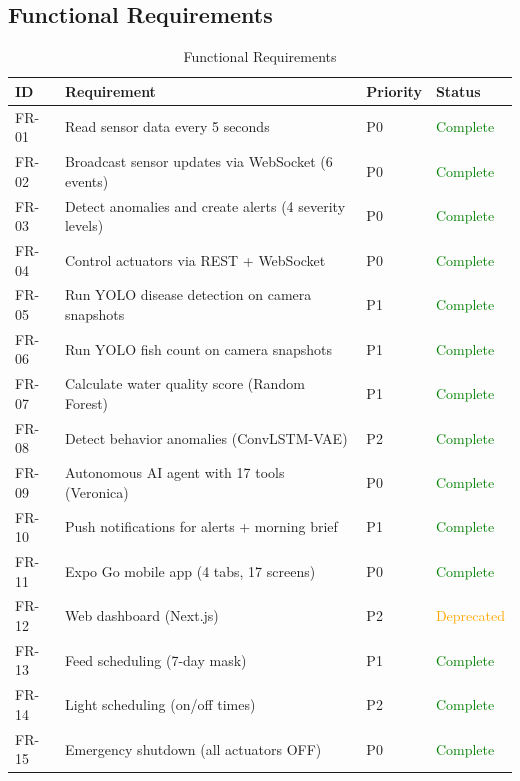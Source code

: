 \documentclass[12pt,a4paper,oneside]{article}
\begin{document}
\subsection{Functional Requirements}
\begin{table}[H]
    \centering
    \begin{tabularx}{\textwidth}{llll}
        \toprule
        \textbf{ID} & \textbf{Requirement} & \textbf{Priority} & \textbf{Status} \\
        \midrule
        FR-01 & Read sensor data every 5 seconds & P0 & \textcolor{green}{Complete} \\
        FR-02 & Broadcast sensor updates via WebSocket (6 events) & P0 & \textcolor{green}{Complete} \\
        FR-03 & Detect anomalies and create alerts (4 severity levels) & P0 & \textcolor{green}{Complete} \\
        FR-04 & Control actuators via REST + WebSocket & P0 & \textcolor{green}{Complete} \\
        FR-05 & Run YOLO disease detection on camera snapshots & P1 & \textcolor{green}{Complete} \\
        FR-06 & Run YOLO fish count on camera snapshots & P1 & \textcolor{green}{Complete} \\
        FR-07 & Calculate water quality score (Random Forest) & P1 & \textcolor{green}{Complete} \\
        FR-08 & Detect behavior anomalies (ConvLSTM-VAE) & P2 & \textcolor{green}{Complete} \\
        FR-09 & Autonomous AI agent with 17 tools (Veronica) & P0 & \textcolor{green}{Complete} \\
        FR-10 & Push notifications for alerts + morning brief & P1 & \textcolor{green}{Complete} \\
        FR-11 & Expo Go mobile app (4 tabs, 17 screens) & P0 & \textcolor{green}{Complete} \\
        FR-12 & Web dashboard (Next.js) & P2 & \textcolor{orange}{Deprecated} \\
        FR-13 & Feed scheduling (7-day mask) & P1 & \textcolor{green}{Complete} \\
        FR-14 & Light scheduling (on/off times) & P2 & \textcolor{green}{Complete} \\
        FR-15 & Emergency shutdown (all actuators OFF) & P0 & \textcolor{green}{Complete} \\
        \bottomrule
    \end{tabularx}
    \caption{Functional Requirements}
\end{table}
\end{document}
